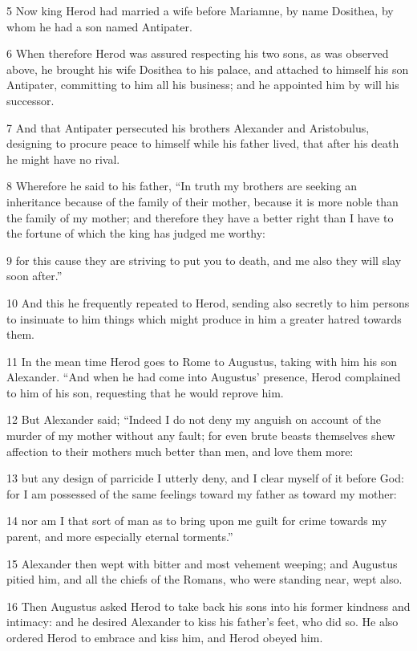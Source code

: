 5 Now king Herod had married a wife before Mariamne, by name Dosithea, by whom he had a son named Antipater. 

6 When therefore Herod was assured respecting his two sons, as was observed above, he brought his wife Dosithea to his palace, and attached to himself his son Antipater, committing to him all his business; and he appointed him by will his successor. 

7 And that Antipater persecuted his brothers Alexander and Aristobulus, designing to procure peace to himself while his father lived, that after his death he might have no rival. 

8 Wherefore he said to his father, “In truth my brothers are seeking an inheritance because of the family of their mother, because it is more noble than the family of my mother; and therefore they have a better right than I have to the fortune of which the king has judged me worthy: 

9 for this cause they are striving to put you to death, and me also they will slay soon after.” 

10 And this he frequently repeated to Herod, sending also secretly to him persons to insinuate to him things which might produce in him a greater hatred towards them. 

11 In the mean time Herod goes to Rome to Augustus, taking with him his son Alexander. “And when he had come into Augustus’ presence, Herod complained to him of his son, requesting that he would reprove him. 

12 But Alexander said; “Indeed I do not deny my anguish on account of the murder of my mother without any fault; for even brute beasts themselves shew affection to their mothers much better than men, and love them more: 

13 but any design of parricide I utterly deny, and I clear myself of it before God: for I am possessed of the same feelings toward my father as toward my mother: 

14 nor am I that sort of man as to bring upon me guilt for crime towards my parent, and more especially eternal torments.” 

15 Alexander then wept with bitter and most vehement weeping; and Augustus pitied him, and all the chiefs of the Romans, who were standing near, wept also. 

16 Then Augustus asked Herod to take back his sons into his former kindness and intimacy: and he desired Alexander to kiss his father’s feet, who did so. He also ordered Herod to embrace and kiss him, and Herod obeyed him. 


